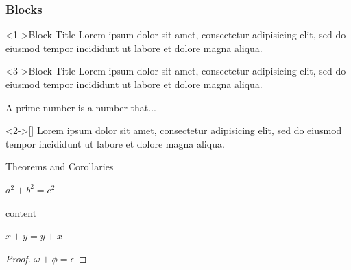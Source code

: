 \documentclass{beamer}
\begin{document}
\begin{frame}
	\frametitle{Blocks}
	\begin{block}<1->{Block Title}
		Lorem ipsum dolor sit amet, consectetur adipisicing elit,
		sed do eiusmod tempor incididunt ut labore et
		dolore magna aliqua.
	\end{block}
	\begin{alertblock}<3->{Block Title}
		Lorem ipsum dolor sit amet, consectetur adipisicing elit,
		sed do eiusmod tempor incididunt ut labore et
		dolore magna aliqua.
	\end{alertblock}
	\begin{definition}
		A prime number is a number that...
	\end{definition}
	\begin{example}<2->[\citealp{Bowen1975}]
		Lorem ipsum dolor sit amet, consectetur adipisicing elit,
		sed do eiusmod tempor incididunt ut labore et
		dolore magna aliqua.
	\end{example}
\end{frame}


\begin{frame}{Theorems and Corollaries}

	\begin{theorem}[Pythagoras]
		$ a^2 + b^2 = c^2$
	\end{theorem}

	\begin{theorem}
		content
	\end{theorem}

	\begin{corollary}
		$ x + y = y + x  $
	\end{corollary}
	\begin{proof}
		$\omega +\phi = \epsilon $
	\end{proof}
\end{frame}
\end{document}
